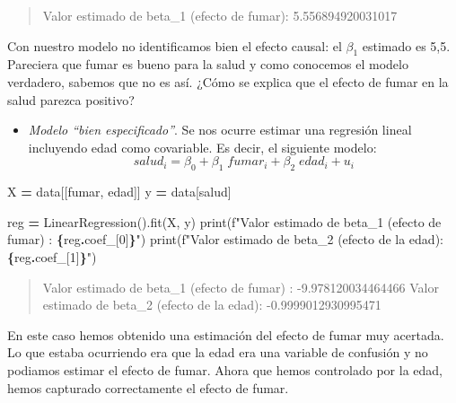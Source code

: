 \documentclass[
  a4paper,
  DIV=11,
  numbers=noendperiod]{scrreprt}
\newenvironment{Shaded}{\begin{snugshade}}{\end{snugshade}}
\newcommand{\BuiltInTok}[1]{#1}
\newcommand{\DecValTok}[1]{\textcolor[rgb]{0.00,0.00,0.81}{#1}}
\newcommand{\NormalTok}[1]{#1}
\newcommand{\OperatorTok}[1]{\textcolor[rgb]{0.81,0.36,0.00}{\textbf{#1}}}
\newcommand{\SpecialCharTok}[1]{\textcolor[rgb]{0.81,0.36,0.00}{\textbf{#1}}}
\newcommand{\SpecialStringTok}[1]{\textcolor[rgb]{0.31,0.60,0.02}{#1}}
\newcommand{\StringTok}[1]{\textcolor[rgb]{0.31,0.60,0.02}{#1}}
\providecommand{\tightlist}{%
  \setlength{\itemsep}{0pt}\setlength{\parskip}{0pt}}\usepackage{longtable,booktabs,array}
\begin{document}
\begin{quote}
Valor estimado de beta\_1 (efecto de fumar): 5.556894920031017
\end{quote}

Con nuestro modelo no identificamos bien el efecto causal: el
\(\beta_1\) estimado es 5,5. Pareciera que fumar es bueno para la salud
y como conocemos el modelo verdadero, sabemos que no es así. ¿Cómo se
explica que el efecto de fumar en la salud parezca positivo?

\begin{itemize}
\tightlist
\item
  \emph{Modelo ``bien especificado''}. Se nos ocurre estimar una
  regresión lineal incluyendo edad como covariable. Es decir, el
  siguiente modelo:
  \[salud_i = \beta_0 + \beta_1  \; fumar_i + \beta_2  \; edad_i +  u_i\]
\end{itemize}

\begin{Shaded}
\begin{Highlighting}[numbers=left,,]
\NormalTok{X }\OperatorTok{=}\NormalTok{ data[[}\StringTok{\textquotesingle{}fumar\textquotesingle{}}\NormalTok{, }\StringTok{\textquotesingle{}edad\textquotesingle{}}\NormalTok{]]}
\NormalTok{y }\OperatorTok{=}\NormalTok{ data[}\StringTok{\textquotesingle{}salud\textquotesingle{}}\NormalTok{]}

\NormalTok{reg }\OperatorTok{=}\NormalTok{ LinearRegression().fit(X, y)}
\BuiltInTok{print}\NormalTok{(}\SpecialStringTok{f"Valor estimado de beta\_1 (efecto de fumar)  : }\SpecialCharTok{\{}\NormalTok{reg}\SpecialCharTok{.}\NormalTok{coef\_[}\DecValTok{0}\NormalTok{]}\SpecialCharTok{\}}\SpecialStringTok{"}\NormalTok{)}
\BuiltInTok{print}\NormalTok{(}\SpecialStringTok{f"Valor estimado de beta\_2 (efecto de la edad): }\SpecialCharTok{\{}\NormalTok{reg}\SpecialCharTok{.}\NormalTok{coef\_[}\DecValTok{1}\NormalTok{]}\SpecialCharTok{\}}\SpecialStringTok{"}\NormalTok{)}
\end{Highlighting}
\end{Shaded}

\begin{quote}
Valor estimado de beta\_1 (efecto de fumar) : -9.978120034464466 Valor
estimado de beta\_2 (efecto de la edad): -0.9999012930995471
\end{quote}

En este caso hemos obtenido una estimación del efecto de fumar muy
acertada. Lo que estaba ocurriendo era que la edad era una variable de
confusión y no podiamos estimar el efecto de fumar. Ahora que hemos
controlado por la edad, hemos capturado correctamente el efecto de
fumar.
\end{document}
